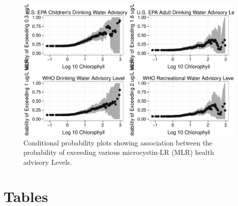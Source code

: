 \documentclass[11pt,]{article}
\begin{document}
\newpage

\begin{figure}[htbp]
\centering
\includegraphics{manuscript_files/figure-latex/epa_child_cp_plot-1.pdf}
\caption{Conditional probability plots showing association between the
probability of exceeding various microcystin-LR (MLR) health advisory
Levels. \label{fig:multi_cp_plot}}
\end{figure}

\newpage

\section{Tables}\label{tables}
\end{document}
